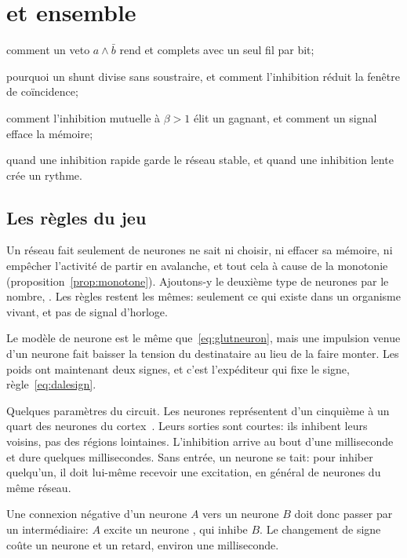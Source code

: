 \chapter{ et  ensemble}
\label{sec:gaba}
\begin{chaptergoals}
\item comment un veto $a\wedge\bar b$ rend  et  complets avec un seul fil par bit;
\item pourquoi un shunt divise sans soustraire, et comment l'inhibition réduit la fenêtre de coïncidence;
\item comment l'inhibition mutuelle à $\beta>1$ élit un gagnant, et comment un signal efface la mémoire;
\item quand une inhibition rapide garde le réseau stable, et quand une inhibition lente crée un rythme.
\end{chaptergoals}

\section{Les règles du jeu}

Un réseau fait seulement de neurones  ne sait ni choisir, ni effacer sa mémoire, ni empêcher l'activité de partir en avalanche, et tout cela à cause de la monotonie (proposition~\ref{prop:monotone}). Ajoutons-y le deuxième type de neurones par le nombre, . Les règles restent les mêmes: seulement ce qui existe dans un organisme vivant, et pas de signal d'horloge.

Le modèle de neurone est le même que~\eqref{eq:glutneuron}, mais une impulsion venue d'un neurone  fait baisser la tension du destinataire au lieu de la faire monter. Les poids ont maintenant deux signes, et c'est l'expéditeur qui fixe le signe, règle~\eqref{eq:dalesign}.

Quelques paramètres du circuit. Les neurones  représentent d'un cinquième à un quart des neurones du cortex~\cite{Hendry1987}. Leurs sorties sont courtes: ils inhibent leurs voisins, pas des régions lointaines. L'inhibition arrive au bout d'une milliseconde et dure quelques millisecondes. Sans entrée, un neurone  se tait: pour inhiber quelqu'un, il doit lui-même recevoir une excitation, en général de neurones  du même réseau.

Une connexion négative d'un neurone  $A$ vers un neurone $B$ doit donc passer par un intermédiaire: $A$ excite un neurone , qui inhibe $B$. Le changement de signe coûte un neurone et un retard, environ une milliseconde.

